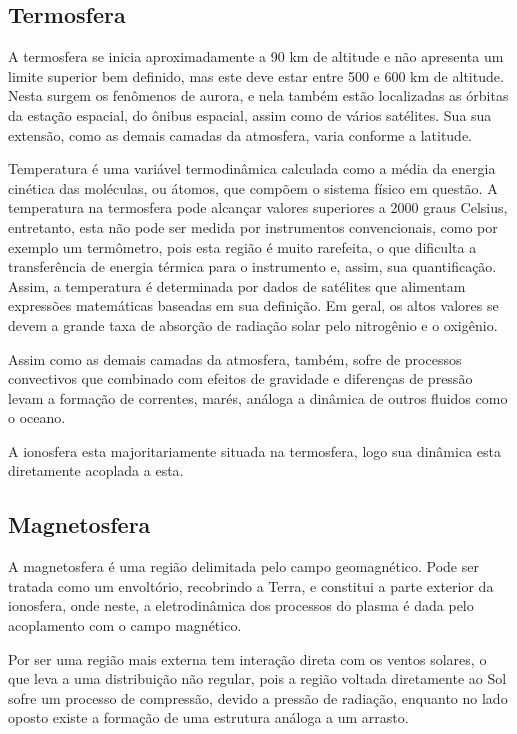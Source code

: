 \subsection{Termosfera}

A termosfera se inicia aproximadamente a 90 km de altitude e não apresenta um limite superior bem definido, mas este deve estar entre 500 e 600 km de altitude. Nesta surgem os fenômenos de aurora, e nela também estão localizadas as órbitas da estação espacial, do ônibus espacial, assim como de vários satélites. Sua sua extensão, como as demais camadas da atmosfera, varia conforme a latitude. 

Temperatura é uma variável termodinâmica calculada como a média da energia cinética das moléculas, ou átomos, que compõem o sistema físico em questão. A temperatura na termosfera pode alcançar valores superiores a 2000 graus Celsius, entretanto, esta não pode ser medida por instrumentos convencionais, como por exemplo um termômetro, pois esta região é muito rarefeita, o que dificulta a transferência de energia térmica para o instrumento e, assim, sua quantificação. Assim, a temperatura é determinada por dados de satélites que alimentam expressões matemáticas baseadas em sua definição. Em geral, os altos valores se devem a grande taxa de absorção de radiação solar pelo nitrogênio e o oxigênio.

Assim como as demais camadas da atmosfera, também, sofre de processos convectivos que combinado com efeitos de gravidade e diferenças de pressão levam a formação de correntes, marés, análoga a dinâmica de outros fluidos como o oceano.

A ionosfera esta majoritariamente situada na termosfera, logo sua dinâmica esta diretamente acoplada a esta.

\subsection{Magnetosfera}

A magnetosfera é uma região delimitada pelo campo geomagnético. Pode ser tratada como um envoltório, recobrindo a Terra, e constitui a parte exterior da ionosfera, onde neste, a eletrodinâmica dos processos do plasma é dada pelo acoplamento com o campo magnético.

Por ser uma região mais externa tem interação direta com os ventos solares, o que leva  a uma distribuição não regular, pois a região voltada diretamente ao Sol sofre um processo de compressão, devido a pressão de radiação, enquanto no lado oposto existe a formação de uma estrutura análoga a um arrasto.

